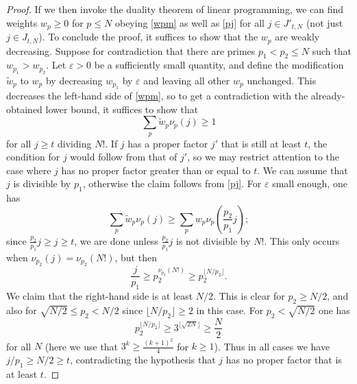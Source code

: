 \documentclass[12pt,a4paper,reqno]{amsart}
\numberwithin{equation}{section}
\theoremstyle{plain}
\theoremstyle{definition}
\newcommand\eps{\varepsilon}
\begin{document}
\begin{proof}
If we then invoke the duality theorem of linear programming, we can find weights $w_p \geq 0$ for $p \leq N$ obeying \eqref{wpm} as well as \eqref{pj} for all $j \in J'_{t,N}$ (not just $j \in J_{t,N}$).  To conclude the proof, it suffices to show that the $w_p$ are weakly decreasing. Suppose for contradiction that there are primes $p_1 < p_2 \leq N$ such that $w_{p_1} > w_{p_2}$.  Let $\eps>0$ be a sufficiently small quantity, and define the modification $\tilde w_p$ to $w_p$ by decreasing $w_{p_1}$ by $\eps$ and leaving all other $w_p$ unchanged.  This decreases the left-hand side of \eqref{wpm}, so to get a contradiction with the already-obtained lower bound, it suffices to show that
  $$ \sum_p \tilde w_p \nu_p(j) \geq 1$$
  for all $j \geq t$ dividing $N!$.  If $j$ has a proper factor $j'$ that is still at least $t$, the condition for $j$ would follow from that of $j'$, so we may restrict attention to the case where $j$ has no proper factor greater than or equal to $t$.  We can assume that $j$ is divisible by $p_1$, otherwise the claim follows from \eqref{pj}.  For $\eps$ small enough, one has
  $$ \sum_p \tilde w_p \nu_p(j) \geq \sum_p w_p \nu_p\left(\frac{p_2}{p_1} j\right);$$
since $\frac{p_2}{p_1} j \geq j \geq t$, we are done unless $\frac{p_2}{p_1} j$ is not divisible by $N!$. This only occurs when $\nu_{p_2}(j) = \nu_{p_2}(N!)$, but then
$$ \frac{j}{p_1} \geq p_2^{\nu_{p_2}(N!)} \geq p_2^{\lfloor N/p_2\rfloor}.$$
We claim that the right-hand side is at least $N/2$.  This is clear for $p_2 \geq N/2$, and also for $\sqrt{N/2} \leq p_2 < N/2$ since $\lfloor N/p_2\rfloor \geq 2$ in this case.  For $p_2 < \sqrt{N/2}$ one has 
$$  p_2^{\lfloor N/p_2\rfloor} \geq 3^{\lfloor \sqrt{2N} \rfloor} \geq \frac{N}{2}$$
for all $N$ (here we use that $3^k \geq \frac{(k+1)^2}{4}$ for $k \geq 1$).  Thus in all cases we have $j/p_1 \geq N/2 \geq t$, contradicting the hypothesis that $j$ has no proper factor that is at least $t$.
\end{proof}
\end{document}
